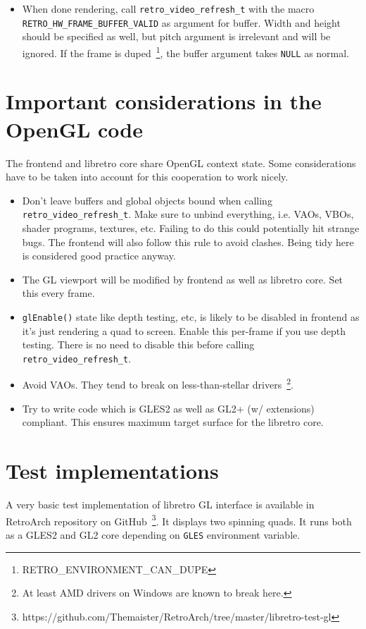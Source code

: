 \documentclass[11pt]{article}
\begin{document}
\begin{itemize}
\item When done rendering, call \texttt{retro\_video\_refresh\_t} with the macro \texttt{RETRO\_HW\_FRAME\_BUFFER\_VALID} as argument for buffer. Width and height should be specified as well, but pitch argument is irrelevant and will be ignored. If the frame is duped~\footnote{RETRO\_ENVIRONMENT\_CAN\_DUPE}, the buffer argument takes \texttt{NULL} as normal.
\end{itemize}

\section*{Important considerations in the OpenGL code}
The frontend and libretro core share OpenGL context state. Some considerations have to be taken into account for this cooperation to work nicely.

\begin{itemize}
\item Don't leave buffers and global objects bound when calling \\\texttt{retro\_video\_refresh\_t}.
Make sure to unbind everything, i.e. VAOs, VBOs, shader programs, textures, etc. Failing to do this could potentially hit strange bugs. The frontend will also follow this rule to avoid clashes. Being tidy here is considered good practice anyway.

\item The GL viewport will be modified by frontend as well as libretro core. Set this every frame.

\item \texttt{glEnable()} state like depth testing, etc, is likely to be disabled in frontend as it's just rendering a quad to screen. Enable this per-frame if you use depth testing.
There is no need to disable this before calling \\\texttt{retro\_video\_refresh\_t}.

\item Avoid VAOs. They tend to break on less-than-stellar drivers~\footnote{At least AMD drivers on Windows are known to break here.}.

\item Try to write code which is GLES2 as well as GL2+ (w/ extensions) compliant. This ensures maximum target surface for the libretro core.
\end{itemize}

\section*{Test implementations}
A very basic test implementation of libretro GL interface is available in RetroArch repository on GitHub~\footnote{https://github.com/Themaister/RetroArch/tree/master/libretro-test-gl}.
It displays two spinning quads. It runs both as a GLES2 and GL2 core depending on \texttt{GLES} environment variable.
\end{document}
